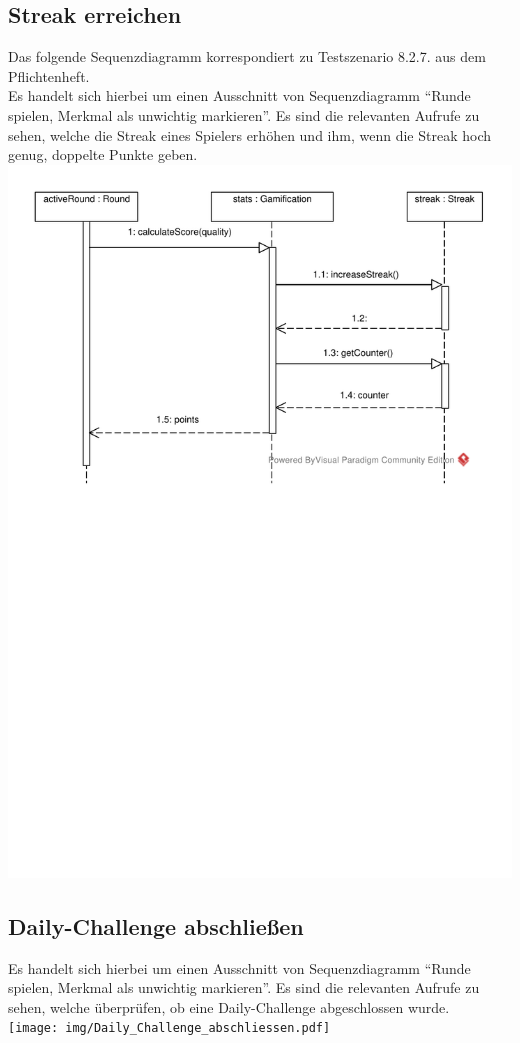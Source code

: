 \documentclass[a4paper]{scrreprt}
\begin{document}
	\subsection{Streak erreichen}
	Das folgende Sequenzdiagramm korrespondiert zu Testszenario 8.2.7. aus dem Pflichtenheft. \\
	Es handelt sich hierbei um einen Ausschnitt von Sequenzdiagramm \enquote{Runde spielen, Merkmal als unwichtig markieren}. Es sind die relevanten Aufrufe zu sehen, welche die Streak eines Spielers erhöhen und ihm, wenn die Streak hoch genug, doppelte Punkte geben. \\
	\includegraphics[width=\textwidth]{img/Streak_erreichen.pdf}


	\subsection{Daily-Challenge abschließen}
	Es handelt sich hierbei um einen Ausschnitt von Sequenzdiagramm \enquote{Runde spielen, Merkmal als unwichtig markieren}. Es sind die relevanten Aufrufe zu sehen, welche überprüfen, ob eine Daily-Challenge abgeschlossen wurde. \\
	\texttt{[image: img/Daily\_Challenge\_abschliessen.pdf]}
\end{document}
